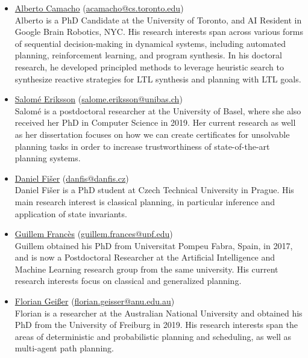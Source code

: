 \documentclass[10pt]{article}
\begin{document}
\begin{itemize}

\item \href{http://}{Alberto Camacho}
(\href{mailto:acamacho@cs.toronto.edu}{acamacho@cs.toronto.edu})\\
Alberto is a PhD Candidate at the University of Toronto, and AI Resident in
Google Brain Robotics, NYC. His research interests span across various
forms of sequential decision-making in dynamical systems, including
automated planning, reinforcement learning, and program synthesis. In
his doctoral research, he developed principled methods to leverage
heuristic search to synthesize reactive strategies for LTL synthesis and
planning with LTL goals.

\item \href{http://}{Salom\'{e} Eriksson}
(\href{mailto:salome.eriksson@unibas.ch}{salome.eriksson@unibas.ch})\\
Salom\'{e} is a postdoctoral researcher at the University of Basel, where she also received
her PhD in Computer Science in 2019. Her current research as well as her
dissertation focuses on how we can create certificates for
unsolvable planning tasks in order to increase trustworthiness of
state-of-the-art planning systems.

\item \href{http://}{Daniel Fi\v{s}er}
(\href{mailto:danfis@danfis.cz}{danfis@danfis.cz})\\
Daniel Fi\v{s}er is a PhD student at Czech Technical University in Prague.
His main research interest is classical planning, in particular inference and
application of state invariants.

\item \href{https://www.upf.edu/web/ai-ml/entry/-/-/31934/adscripcion/guillem-franc%C3%A8s}{Guillem Franc\`{e}s}
    (\href{mailto:guillem.frances@upf.edu}{guillem.frances@upf.edu})\\
Guillem obtained his PhD from Universitat Pompeu Fabra, Spain, in 2017, and
is now a Postdoctoral Researcher at the Artificial Intelligence and Machine
Learning research group from the same university.
His current research interests focus on classical and generalized planning.

\item \href{https://cecs.anu.edu.au/people/florian-geisser}{Florian Gei{\ss}er}
(\href{mailto:florian.geisser@anu.edu.au}{florian.geisser@anu.edu.au})\\
Florian is a researcher at the Australian National University and obtained his
PhD from the University of Freiburg in 2019. His research interests span the
areas of deterministic and probabilistic planning and scheduling, as well as
multi-agent path planning.


\end{itemize}
\end{document}
